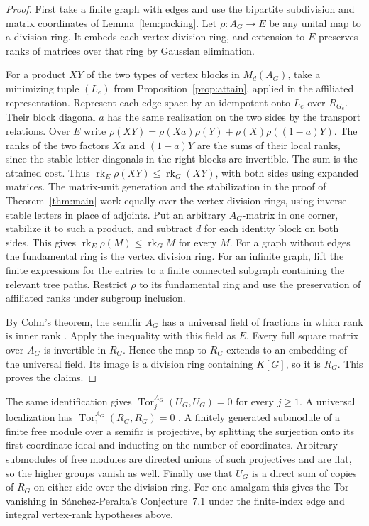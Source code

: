\documentclass[11pt,a4paper,reqno]{amsart}
\numberwithin{equation}{section}
\theoremstyle{remark}
\newcommand{\rk}{\operatorname{rk}}
\begin{document}
\begin{proof}
First take a finite graph with edges and use the bipartite subdivision and matrix coordinates of Lemma~\ref{lem:packing}. Let \(\rho:A_G\to E\) be any unital map to a division ring. It embeds each vertex division ring, and extension to \(E\) preserves ranks of matrices over that ring by Gaussian elimination.

For a product \(XY\) of the two types of vertex blocks in \(M_d(A_G)\), take a minimizing tuple \((L_e)\) from Proposition~\ref{prop:attain}, applied in the affiliated representation. Represent each edge space by an idempotent onto \(L_e\) over \(R_{G_e}\). Their block diagonal \(a\) has the same realization on the two sides by the transport relations. Over \(E\) write \(\rho(XY)=\rho(Xa)\rho(Y)+\rho(X)\rho((1-a)Y)\). The ranks of the two factors \(Xa\) and \((1-a)Y\) are the sums of their local ranks, since the stable-letter diagonals in the right blocks are invertible. The sum is the attained cost. Thus \(\rk_E\rho(XY)\le\rk_G(XY)\), with both sides using expanded matrices. The matrix-unit generation and the stabilization in the proof of Theorem~\ref{thm:main} work equally over the vertex division rings, using inverse stable letters in place of adjoints. Put an arbitrary \(A_G\)-matrix in one corner, stabilize it to such a product, and subtract \(d\) for each identity block on both sides. This gives \(\rk_E\rho(M)\le\rk_G M\) for every \(M\). For a graph without edges the fundamental ring is the vertex division ring. For an infinite graph, lift the finite expressions for the entries to a finite connected subgraph containing the relevant tree paths. Restrict \(\rho\) to its fundamental ring and use the preservation of affiliated ranks under subgroup inclusion.

By Cohn's theorem, the semifir \(A_G\) has a universal field of fractions in which rank is inner rank \cite[Theorem~7.5.13 and Corollary~7.5.14]{CohnBook}. Apply the inequality with this field as \(E\). Every full square matrix over \(A_G\) is invertible in \(R_G\). Hence the map to \(R_G\) extends to an embedding of the universal field. Its image is a division ring containing \(K[G]\), so it is \(R_G\). This proves the claims.
\end{proof}

The same identification gives \(\operatorname{Tor}^{A_G}_j(U_G,U_G)=0\) for every \(j\ge1\). A universal localization has \(\operatorname{Tor}_1^{A_G}(R_G,R_G)=0\) \cite[Lemma~8.6(ii)]{NR}. A finitely generated submodule of a finite free module over a semifir is projective, by splitting the surjection onto its first coordinate ideal and inducting on the number of coordinates. Arbitrary submodules of free modules are directed unions of such projectives and are flat, so the higher groups vanish as well. Finally use that \(U_G\) is a direct sum of copies of \(R_G\) on either side over the division ring. For one amalgam this gives the Tor vanishing in S\'anchez-Peralta's Conjecture~7.1 \cite{Sanchez} under the finite-index edge and integral vertex-rank hypotheses above.
\end{document}
